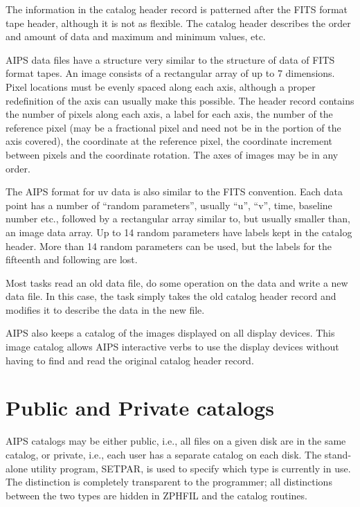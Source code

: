 The information in the catalog header record is patterned after the
FITS format tape header, although it is not as flexible. The
catalog header describes the order and amount of data and maximum and
minimum values, etc.

AIPS data files have a structure very similar to the structure of data
of FITS format tapes.  An image consists of a rectangular array of up
to 7 dimensions.  Pixel locations must be evenly spaced along each
axis, although a proper redefinition of the axis can usually make this
possible.  The header record contains the number of pixels along each
axis, a label for each axis, the number of the reference pixel (may be
a fractional pixel and need not be in the portion of the axis
covered), the coordinate at the reference pixel, the coordinate
increment between pixels and the coordinate rotation.  The axes of
images may be in any order.

The AIPS format for uv data is also similar to the FITS convention.
Each data point has a number of ``random parameters'', usually ``u'', ``v'',
time, baseline number etc., followed by a rectangular array similar to,
but usually smaller than, an image data array.  Up to 14 random
parameters have labels kept in the catalog header.  More than 14 random
parameters can be used, but the labels for the fifteenth and following
are lost.

Most tasks read an old data file, do some operation on the data and
write a new data file.  In this case, the task simply takes the old
catalog header record and modifies it to describe the data in the new
file.

AIPS also keeps a catalog of the images displayed on all display
devices.  This image catalog allows AIPS interactive verbs to use the
display devices without having to find and read the original catalog
header record.

\section{Public and Private catalogs}

AIPS catalogs may be either public, i.e., all files on a given disk
are in the same catalog, or private, i.e., each user has a separate
catalog on each disk.  The stand-alone utility program, SETPAR, is
used to specify which type is currently in use.  The distinction is
completely transparent to the programmer; all distinctions between the
two types are hidden in ZPHFIL and the catalog routines.


